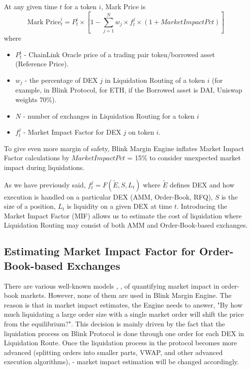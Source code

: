 \documentclass[conference]{IEEEtran}
\begin{document}
At any given time $t$ for a token $i$, Mark Price is \small $$\text{Mark Price}^{i}_{t}=P^{i}_{t}\times[1-\sum_{j=1}^{N}  w_{j}\times f_{t}^{j}\times(1+MarketImpactPct)]$$
where

\begin{itemize}
\item $P^{i}_{t}$ - ChainLink Oracle price of a trading pair token/borrowed asset (Reference Price).
\item $w_{j}$ - the percentage of DEX $j$ in Liquidation Routing of a token $i$ (for example, in Blink Protocol, for ETH, if the Borrowed asset is DAI,  Uniswap weights 70\%).
\item $N$ - number of exchanges in Liquidation Routing for a token $i$ 
\item $f_{t}^{j}$ - Market Impact Factor for DEX $j$ on token $i$.
	
\end{itemize}


To give even more margin of safety, Blink Margin Engine inflates Market Impact Factor calculations by $MarketImpactPct$ = 15\% to consider unexpected market impact during liquidations. 

As we have previously said, $f_{t}^{j} = F(\widetilde{E}, S, L_{t})$ where $\widetilde{E}$ defines DEX and how execution is handled on a particular DEX (AMM, Order-Book, RFQ), $S$ is the size of a position, $L_{t}$ is liquidity on a given DEX at time $t$. Introducing the Market Impact Factor (MIF) allows us to estimate the cost of liquidation where Liquidation Routing may consist of both AMM and Order-Book-based exchanges.


\subsection{Estimating Market Impact Factor for Order-Book-based Exchanges}

There are various well-known models \cite{almgren2005}, \cite{kissel2004}, \cite{kyle1985} of quantifying market impact in order-book markets. However, none of them are used in Blink Margin Engine. The reason is that in market impact estimates, the Engine needs to answer, "By how much liquidating a large order size with a single market order will shift the price from the equilibrium?". This decision is mainly driven by the fact that the liquidation process on Blink Protocol is done through one order for each DEX in Liquidation Route. Once the liquidation process in the protocol becomes more advanced (splitting orders into smaller parts, VWAP, and other advanced execution algorithms), - market impact estimation will be changed accordingly.  
\end{document}
